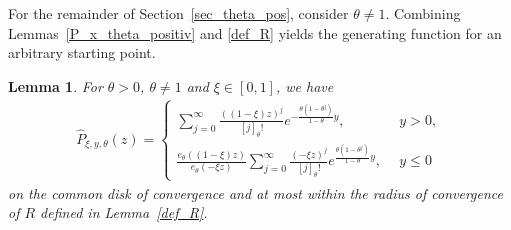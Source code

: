\documentclass[10pt,a4paper]{amsart}
\newcommand{\1}{\mathds{1}}
\newtheorem{Lemma}[definition]{Lemma}
\begin{document}
    For the remainder of Section~\ref{sec_theta_pos}, consider $\theta\neq 1$.
Combining Lemmas~\ref{P_x_theta_positiv} and \ref{def_R} yields the generating function for an arbitrary starting point.
\begin{Lemma}\label{gf_pos_theta}
   For $\theta>0$, $\theta\neq 1$ and $\xi\in[0,1]$, we have
    \begin{align*}
      \hat{P}_{\xi,y,\theta}(z)=\begin{cases}
        \sum_{j=0}^\infty \frac{((1-\xi)z)^j}{[j]_\theta!}e^{-\frac{\theta(1-\theta^j)}{1-\theta}y},&y>0,
          \\\frac{e_\theta((1-\xi)z)}{e_\theta(-\xi z)}\sum_{j=0}^\infty \frac{(-\xi z)^{j}}{[j]_\theta!}e^{\frac{\theta(1-\theta^j)}{1-\theta}y},~~&y\le 0
      \end{cases}
    \end{align*}
    on the common disk of convergence and at most within the radius of convergence of $R$ defined in Lemma~\ref{def_R}.
\end{Lemma}
\end{document}
